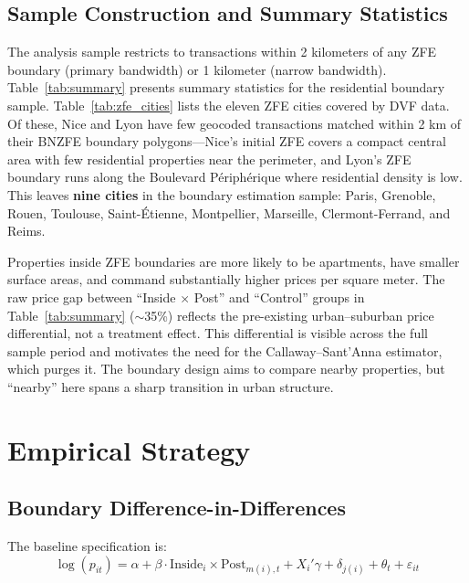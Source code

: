 \documentclass[12pt]{article}
\begin{document}
\subsection{Sample Construction and Summary Statistics}

The analysis sample restricts to transactions within 2 kilometers of any ZFE boundary (primary bandwidth) or 1 kilometer (narrow bandwidth). Table~\ref{tab:summary} presents summary statistics for the residential boundary sample. Table~\ref{tab:zfe_cities} lists the eleven ZFE cities covered by DVF data. Of these, Nice and Lyon have few geocoded transactions matched within 2 km of their BNZFE boundary polygons---Nice's initial ZFE covers a compact central area with few residential properties near the perimeter, and Lyon's ZFE boundary runs along the Boulevard P\'eriph\'erique where residential density is low. This leaves \textbf{nine cities} in the boundary estimation sample: Paris, Grenoble, Rouen, Toulouse, Saint-\'Etienne, Montpellier, Marseille, Clermont-Ferrand, and Reims.



Properties inside ZFE boundaries are more likely to be apartments, have smaller surface areas, and command substantially higher prices per square meter. The raw price gap between ``Inside $\times$ Post'' and ``Control'' groups in Table~\ref{tab:summary} ($\sim$35\%) reflects the pre-existing urban--suburban price differential, not a treatment effect. This differential is visible across the full sample period and motivates the need for the Callaway--Sant'Anna estimator, which purges it. The boundary design aims to compare nearby properties, but ``nearby'' here spans a sharp transition in urban structure.


\section{Empirical Strategy} \label{sec:strategy}

\subsection{Boundary Difference-in-Differences}

The baseline specification is:
\begin{equation}
\log(p_{it}) = \alpha + \beta \cdot \text{Inside}_i \times \text{Post}_{m(i),t} + X_i'\gamma + \delta_{j(i)} + \theta_t + \varepsilon_{it}
\label{eq:main}
\end{equation}
\end{document}
